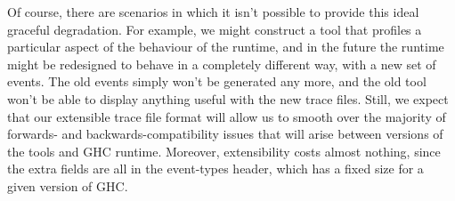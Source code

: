 Of course, there are scenarios in which it isn't possible to provide
this ideal graceful degradation.  For example, we might construct a
tool that profiles a particular aspect of the behaviour of the
runtime, and in the future the runtime might be redesigned to behave
in a completely different way, with a new set of events.  The old
events simply won't be generated any more, and the old tool won't be
able to display anything useful with the new trace files.  Still, we
expect that our extensible trace file format will allow us to smooth
over the majority of forwards- and backwards-compatibility issues that
will arise between versions of the tools and GHC runtime.  Moreover,
extensibility costs almost nothing, since the extra fields are all in
the event-types header, which has a fixed size for a given version of
GHC.
